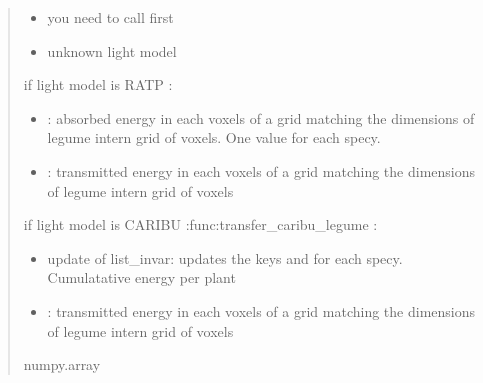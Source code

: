 \documentclass[letterpaper,10pt,english]{sphinxmanual}
\begin{document}
\begin{fulllineitems}
\begin{fulllineitems}
\begin{quote}
\begin{description}
\begin{itemize}
\end{itemize}

\begin{itemize}
\item {} 
\sphinxAtStartPar
{} \textendash{} you need to call {\hyperref[\detokenize{reference:LVM.LightVegeManager.run}]{}} first

\item {} 
\sphinxAtStartPar
{} \textendash{} unknown light model

\end{itemize}

\sphinxAtStartPar

\sphinxAtStartPar
if light model is RATP  :
\begin{itemize}
\item {} 
\sphinxAtStartPar
{}: absorbed energy in each voxels of a grid matching the dimensions of l\sphinxhyphen{}egume intern grid of voxels. One value for each specy.

\item {} 
\sphinxAtStartPar
{}: transmitted energy in each voxels of a grid matching the dimensions of l\sphinxhyphen{}egume intern grid of voxels

\end{itemize}

\sphinxAtStartPar
if light model is CARIBU :func:transfer\_caribu\_legume :
\begin{itemize}
\item {} 
\sphinxAtStartPar
update of list\_invar: updates the keys  and  for each specy. Cumulatative energy per plant

\item {} 
\sphinxAtStartPar
{}: transmitted energy in each voxels of a grid matching the dimensions of l\sphinxhyphen{}egume intern grid of voxels

\end{itemize}


\sphinxAtStartPar
numpy.array

\end{description}\end{quote}


\end{fulllineitems}
\end{fulllineitems}
\end{document}
